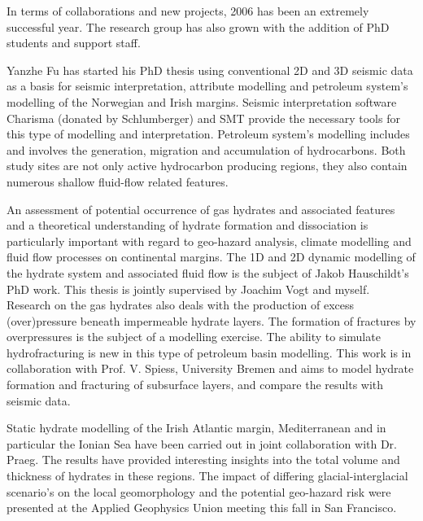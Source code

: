 
In terms of collaborations and new projects, 2006 has been an extremely successful year.
 The research group has also grown with the addition of PhD students and support staff.

Yanzhe Fu has started his PhD thesis using conventional 2D and 3D seismic data as a basis for seismic interpretation, attribute modelling and petroleum system's modelling of the Norwegian and Irish margins. Seismic interpretation software Charisma (donated by Schlumberger) and SMT provide the necessary tools for this type of modelling and interpretation. Petroleum system's modelling includes and involves the generation, migration and accumulation of hydrocarbons. Both study sites are not only active hydrocarbon producing regions, they also contain numerous shallow fluid-flow related features.

An assessment of potential occurrence of gas hydrates and associated features and a theoretical understanding of hydrate formation and dissociation is particularly important with regard to geo-hazard analysis, climate modelling and fluid flow processes on continental margins. The 1D and 2D dynamic modelling of the hydrate system and associated fluid flow is the subject of Jakob Hauschildt's PhD work.  This thesis is jointly supervised by Joachim Vogt and myself. Research on the gas hydrates also deals with the production of excess (over)pressure beneath impermeable hydrate layers. The formation of fractures by overpressures is the subject of a modelling exercise. The ability to simulate hydrofracturing is new in this type of petroleum basin modelling. This work is in collaboration with Prof. V. Spiess, University Bremen and aims to model hydrate formation and fracturing of subsurface layers, and compare the results with seismic data.

Static hydrate modelling of the Irish Atlantic margin, Mediterranean and in particular the Ionian Sea have been carried out in joint collaboration with Dr. Praeg. The results have provided interesting insights into the total volume and thickness of hydrates in these regions. The impact of differing glacial-interglacial scenario's on the local geomorphology and the potential geo-hazard risk were presented at the Applied Geophysics Union meeting this fall in San Francisco.

